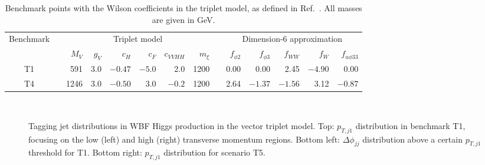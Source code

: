\begin{table}[b!]
  \renewcommand{\arraystretch}{1.2}
  \setlength{\tabcolsep}{0.5em}
  \centering
    \begin{tabular}{c c rrrrrr  c rrrrr}
      \toprule
      \multirow{2}{*}{Benchmark} &\hspace*{1em}& \multicolumn{6}{c}{Triplet model} &\hspace*{1em}&  \multicolumn{5}{c}{Dimension-6 approximation}  \\
      \cmidrule{3-8} \cmidrule{10-14}
      && $M_V$ & $g_V$ & $c_H$ & ${c}_{F}$ & ${c}_{VVHH}$  & $m_\xi$ && $f_{\phi 2}$ & $f_{\phi 3}$ & $f_{WW}$ & $f_W$ & $f_{u \phi 33}$ \\
      \midrule
      T1 && 591 & 3.0 & $-0.47$ & $-5.0$ & 2.0 & 1200 && 0.00 & 0.00 & 2.45 & $-4.90$ & 0.00 \\
      T4 && 1246 & 3.0 & $-0.50$ & $3.0$ & $-0.2$ & 1200 && 2.64 & $-1.37$ & $-1.56$ & 3.12 & $-0.87$ \\
      \bottomrule
    \end{tabular}
  \caption{Benchmark points with the Wilson coefficients in the
    triplet model, as defined in Ref.~\cite{too_long}.  All masses are
    given in GeV.}
  \label{tab:benchmarks}
\end{table}


\begin{figure}[t] \centering
   \\
  \caption{Tagging jet distributions in WBF Higgs production in the
vector triplet model.  Top: $p_{T,j1}$ distribution in benchmark T1,
focusing on the low (left) and high (right) transverse momentum
regions.  Bottom left: $\Delta \phi_{jj}$ distribution above a certain
$p_{T,j1}$ threshold for T1.  Bottom right: $p_{T,j1}$ distribution
for scenario T5.}
  \label{fig:validity_triplet_wbf}
\end{figure}

